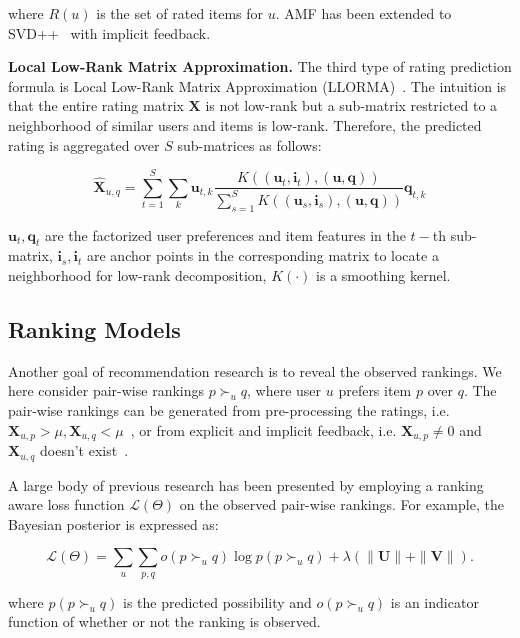 \documentclass[letterpaper]{article} %
\newcommand{\Rating}{\mathbf{X}}
\newcommand{\Loss}{\mathcal{L}}
\begin{document}
where  $R(u)$ is the set of rated items for $u$. AMF has been extended to SVD++~\cite{Koren2008Factorization} with implicit feedback. 

\textbf{Local Low-Rank Matrix Approximation.} The third type of rating prediction formula is  Local Low-Rank Matrix Approximation (LLORMA)~\cite{Lee2013Local}. The intuition is that the entire rating matrix $\Rating$ is not low-rank but a sub-matrix restricted to a neighborhood of similar users and items is low-rank.  Therefore, the predicted rating is aggregated over $S$ sub-matrices  as follows:

\begin{equation}\label{equ:LLORMA}
\hat{\Rating}_{u,q} = \sum_{t=1}^{S} \sum_k \mathbf{u}_{t, k} \frac{K((\mathbf{u}_t,\mathbf{i}_t),(\mathbf{u},\mathbf{q}))}{\sum_{s=1}^{S} K((\mathbf{u}_s,\mathbf{i}_s),(\mathbf{u},\mathbf{q}))} \mathbf{q}_{t,k}
\end{equation}

$\mathbf{u}_t, \mathbf{q}_t$ are the factorized user preferences and item features in the $t-$th sub-matrix,  $\mathbf{i}_s,\mathbf{i}_t$ are anchor points in the corresponding matrix to locate a neighborhood for low-rank decomposition, $K(\cdot)$ is a smoothing kernel. 


\subsection{Ranking Models}
Another goal of recommendation research is to reveal the observed rankings. We here consider pair-wise rankings $p\succ_u q$, where user $u$ prefers item $p$ over $q$. The pair-wise rankings can be generated from pre-processing  the ratings, i.e. $\Rating_{u,p}> \mu, \Rating_{u,q}<\mu$~\cite{Hu2017Decoupled}, or from explicit and implicit feedback, i.e. $\Rating_{u,p}\neq 0$ and $ \Rating_{u,q}$ doesn't exist~\cite{Rendle2009BPR}. 

A large body of previous research has been presented by employing a ranking aware loss function  $\Loss(\Theta)$ on the observed pair-wise rankings. For example, the Bayesian posterior is expressed as:

\begin{equation}
\Loss(\Theta) = \sum_{u}\sum_{p,q} o(p\succ_u q) \log p(p\succ_u q) + \lambda(\|\mathbf{U}\| + \|\mathbf{V}\|).
\end{equation}

where $p(p\succ_u q)$ is the predicted possibility and $o(p\succ_u q)$ is an indicator function of whether or not the ranking is observed. 
\end{document}
